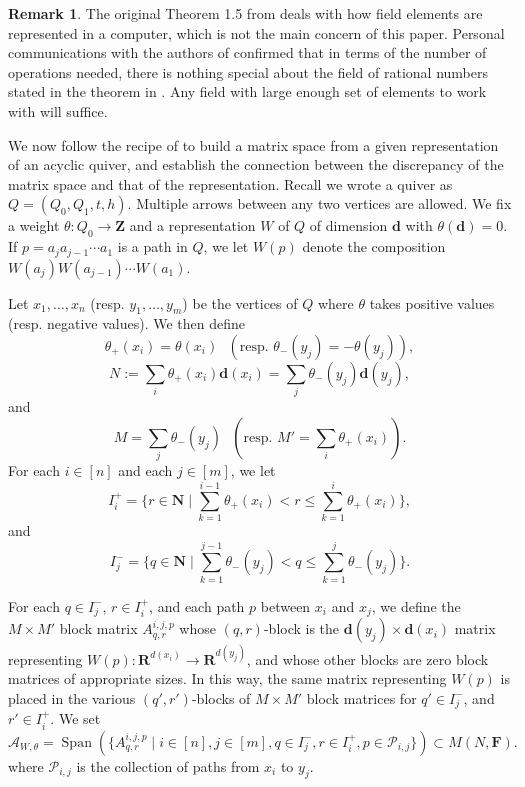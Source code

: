 \documentclass[a4paper]{amsart}
\numberwithin{equation}{section}
\theoremstyle{plain}
\theoremstyle{definition}
\newtheorem{remark}[theorem]{Remark}
\DeclareMathOperator{\Span}{Span}
\begin{document}
\begin{remark}
The original Theorem 1.5 from \cite{MR3868734} deals with how field elements are represented in a computer, which is not the main concern of this paper. Personal communications with the authors of \cite{MR3868734} confirmed that in terms of the number of operations needed, there is nothing special about the field of rational numbers stated in the theorem in \cite{MR3868734}. Any field with large enough set of elements to work with will suffice.
\end{remark}

We now follow the recipe of \cite{https://doi.org/10.48550/arxiv.2111.00039} to build a matrix space from a given representation of an acyclic quiver, and establish the connection between the discrepancy of the matrix space and that of the representation. Recall we wrote a quiver as $Q=(Q_0,Q_1,t,h)$. Multiple arrows between any two vertices are allowed. 
We fix a weight $\theta:Q_0\rightarrow\mathbf{Z}$ and a representation $W$ of $Q$ of dimension $\mathbf{d}$ with $\theta(\mathbf{d})=0$. If $p=a_ja_{j-1}\cdots a_1$ is a path in $Q$, we let $W(p)$ denote the composition $W(a_j)W(a_{j-1})\cdots W(a_1)$. 

Let $x_1,\ldots,x_n$ (resp. $y_1,\ldots,y_m$) be the vertices of $Q$ where $\theta$ takes positive values (resp. negative values). We then define $$\theta_{+}(x_i)=\theta(x_i)\text{ }(\text{resp. }\theta_{-}(y_j)=-\theta(y_j)),$$ 
$$N:=\sum_{i}\theta_{+}(x_i)\mathbf{d}(x_i)=\sum_{j}\theta_{-}(y_j)\mathbf{d}(y_j),$$ and $$M=\sum_{j}\theta_{-}(y_j)\text{ }(\text{resp. }M'=\sum_{i}\theta_{+}(x_i)).$$ For each $i\in[n]$ and each $j\in [m]$, we let 
$$I^{+}_{i}=\{r\in\mathbf{N}\mid \sum_{k=1}^{i-1}\theta_{+}(x_i)< r\leq \sum_{k=1}^{i}\theta_{+}(x_i)\},$$ and 
$$I_{j}^{-}=\{q\in\mathbf{N}\mid \sum_{k=1}^{j-1}\theta_{-}(y_j)< q  \leq\sum_{k=1}^{j}\theta_{-}(y_j)\}.$$

For each $q\in I_{j}^{-}$, $r\in I_{i}^{+}$, and each path $p$ between $x_i$ and $x_j$, we define the $M\times M'$ block matrix $A^{i,j,p}_{q,r}$ whose $(q,r)$-block is the $\mathbf{d}(y_j)\times \mathbf{d}(x_i)$ matrix representing $W(p):\mathbf{R}^{d(x_i)}\rightarrow\mathbf{R}^{d(y_j)}$, and whose other blocks are zero block matrices of appropriate sizes. In this way, the same matrix representing $W(p)$ is placed in the various $(q',r')$-blocks of $M\times M'$ block matrices for $q'\in I_{j}^{-}$, and  $r'\in I_{i}^{+}$. We set $$\mathcal{A}_{W,\theta}=\Span(\{A^{i,j,p}_{q,r}\mid i\in[n], j\in[m], q\in I_{j}^{-},r\in I_{i}^{+}, p\in \mathcal{P}_{i,j}\})\subset M(N,\mathbf{F}).$$
where $\mathcal{P}_{i,j}$ is the collection of paths from $x_{i}$ to $y_j$. 
\end{document}
